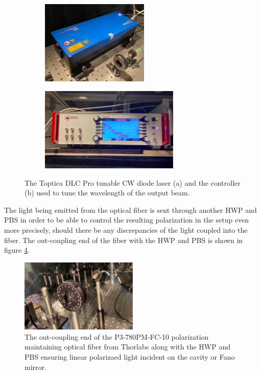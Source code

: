 \begin{figure}[h!]
    \begin{subfigure}[b]{0.49\textwidth}
        \centering
        \includegraphics[height=4cm]{figures/toptica_laser.pdf}
        \caption{}
        \label{fig:toptica_laser}
    \end{subfigure}
    \begin{subfigure}[b]{0.49\textwidth}
        \centering
        \includegraphics[height=4cm]{figures/toptica_controller.pdf}
        \caption{}
        \label{fig:toptica_controller}
    \end{subfigure}
    \caption{The Toptica DLC Pro tunable CW diode laser (a) and the controller (b) used to tune the wavelength of the output beam.}
    \label{fig:toptica_laser_and_controller}
\end{figure}

The light being emitted from the optical fiber is sent through another HWP and PBS in order to be able to control the resulting polarization in the setup even more precisely, should there be any discrepancies of the light coupled into the fiber. The out-coupling end of the fiber with the HWP and PBS is shown in figure \ref{fig:outcoupling_fiber}.

\begin{figure}[h!]
    \centering
    \includegraphics[width=0.5\textwidth]{figures/outcoupling_fiber.pdf}
    \caption{The out-coupling end of the P3-780PM-FC-10 polarization maintaining optical fiber from Thorlabs along with the HWP and PBS ensuring linear polarizaed light incident on the cavity or Fano mirror.}
    \label{fig:outcoupling_fiber}
\end{figure}

